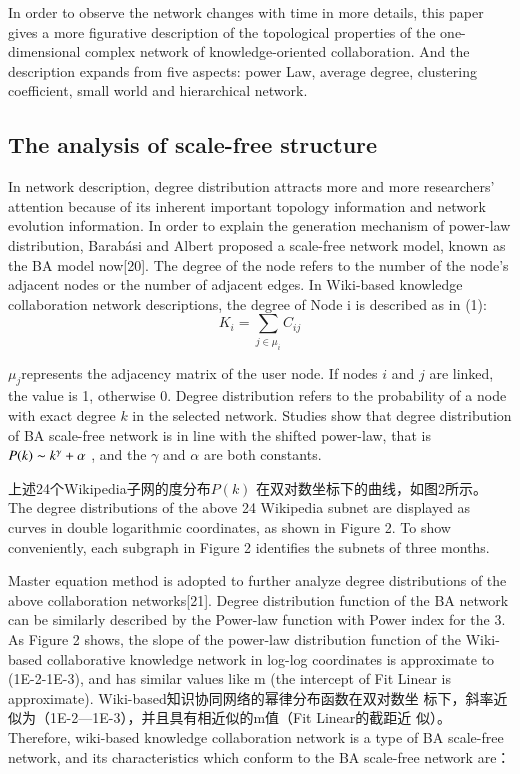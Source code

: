 \documentclass{elsarticle}
\begin{document}
In order to observe the network changes with time in more details, this paper gives a more figurative description of the topological properties of the one-dimensional complex network of knowledge-oriented collaboration. And the description expands from five aspects: power Law, average degree, clustering coefficient, small world and hierarchical network.

\subsection{The analysis of scale-free structure}
\label{sec:analysis-scale-free}

In network description, degree distribution attracts more and more researchers’ attention because of its inherent important topology information and network evolution information. In order to explain the generation mechanism of power-law distribution, Barabási and Albert proposed a scale-free network model, known as the BA model now[20].  The degree of the node refers to the number of the node's adjacent nodes or the number of adjacent edges. In Wiki-based knowledge collaboration network descriptions, the degree of Node i is described as in (1): 
\begin{equation}
  K_i=\sum_{j\in\mu_i}C_{ij}
\end{equation}

$\mu_j$represents the adjacency matrix of the user node. If nodes $i$
and $j$ are linked, the value  is 1, otherwise 0. Degree distribution
refers to the probability of a node with exact degree $k$ in the
selected network. Studies show that degree distribution of BA
scale-free network is in line with the shifted power-law, that is
$P(k)\thicksim k^\gamma+\alpha$  , and the $\gamma$ and $\alpha$ are both
constants. 

上述24个Wikipedia子网的度分布$P(k)$ 在双对数坐标下的曲线，如图2所示。
The degree distributions of the above 24 Wikipedia subnet are
displayed as curves in double logarithmic coordinates, as shown in
Figure 2. To show conveniently, each subgraph in Figure 2 identifies
the subnets of three months.

Master equation method is adopted to further analyze degree
distributions of the above collaboration networks[21]. Degree
distribution function of the BA network can be similarly described by
the Power-law function with Power index for the 3. As Figure 2 shows,
the slope of the power-law distribution function of the Wiki-based
collaborative knowledge network in log-log coordinates is approximate
to (1E-2-1E-3), and has similar values like m (the intercept of Fit
Linear is approximate). Wiki-based知识协同网络的幂律分布函数在双对数坐
标下，斜率近似为（1E-2—1E-3），并且具有相近似的m值（Fit Linear的截距近
似）。Therefore, wiki-based knowledge collaboration network is a type
of BA scale-free network, and its characteristics which conform to the
BA scale-free network are：
\end{document}

